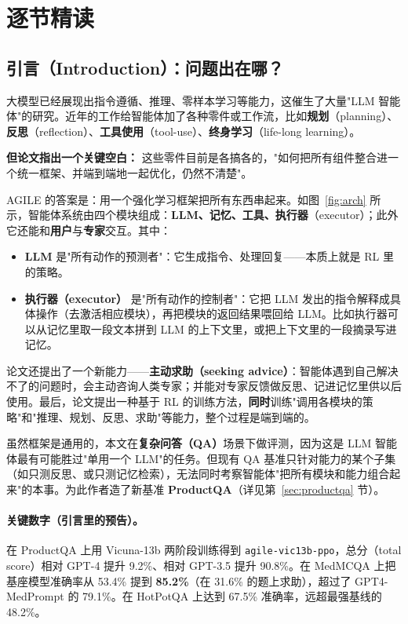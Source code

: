 \documentclass[11pt,UTF8,fontset=fandol]{ctexart}
\begin{document}
\section{逐节精读}

\subsection{引言（Introduction）：问题出在哪？}

大模型已经展现出指令遵循、推理、零样本学习等能力，这催生了大量"LLM 智能体"的研究。近年的工作给智能体加了各种零件或工作流，比如\textbf{规划}（planning）、\textbf{反思}（reflection）、\textbf{工具使用}（tool-use）、\textbf{终身学习}（life-long learning）。

\textbf{但论文指出一个关键空白：} 这些零件目前是各搞各的，"如何把所有组件整合进一个统一框架、并端到端地一起优化，仍然不清楚"。

AGILE 的答案是：用一个强化学习框架把所有东西串起来。如图~\ref{fig:arch} 所示，智能体系统由四个模块组成：\textbf{LLM、记忆、工具、执行器}（executor）；此外它还能和\textbf{用户}与\textbf{专家}交互。其中：

\begin{itemize}[leftmargin=1.5em]
\item \textbf{LLM} 是"所有动作的预测者"：它生成指令、处理回复——本质上就是 RL 里的策略。
\item \textbf{执行器（executor）} 是"所有动作的控制者"：它把 LLM 发出的指令解释成具体操作（去激活相应模块），再把模块的返回结果喂回给 LLM。比如执行器可以从记忆里取一段文本拼到 LLM 的上下文里，或把上下文里的一段摘录写进记忆。
\end{itemize}

论文还提出了一个新能力——\textbf{主动求助（seeking advice）}：智能体遇到自己解决不了的问题时，会主动咨询人类专家；并能对专家反馈做反思、记进记忆里供以后使用。最后，论文提出一种基于 RL 的训练方法，\textbf{同时}训练"调用各模块的策略"和"推理、规划、反思、求助"等能力，整个过程是端到端的。

虽然框架是通用的，本文在\textbf{复杂问答（QA）}场景下做评测，因为这是 LLM 智能体最有可能胜过"单用一个 LLM"的任务。但现有 QA 基准只针对能力的某个子集（如只测反思、或只测记忆检索），无法同时考察智能体"把所有模块和能力组合起来"的本事。为此作者造了新基准 \textbf{ProductQA}（详见第~\ref{sec:productqa} 节）。

\paragraph{关键数字（引言里的预告）。} 在 ProductQA 上用 Vicuna-13b 两阶段训练得到 \texttt{agile-vic13b-ppo}，总分（total score）相对 GPT-4 提升 9.2\%、相对 GPT-3.5 提升 90.8\%。在 MedMCQA 上把基座模型准确率从 53.4\% 提到 \textbf{85.2\%}（在 31.6\% 的题上求助），超过了 GPT4-MedPrompt 的 79.1\%。在 HotPotQA 上达到 67.5\% 准确率，远超最强基线的 48.2\%。
\end{document}
